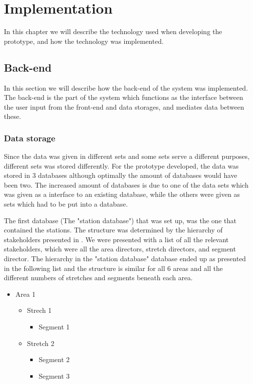 
\chapter{Implementation} %
\label{cha:implementation}
In this chapter we will describe the technology used when developing the 
prototype, and how the technology was implemented. 

\section{Back-end} %
\label{sec:back_end}
In this section we will describe how the back-end of the system was 
implemented. The back-end is the part of the system which functions as the
interface between the user input from the front-end and data storages, and
mediates data between these.

\subsection{Data storage} %
\label{sub:back_end_data_storage}
Since the data was given in different sets and some sets serve a different
purposes, different sets was stored differently. For the prototype developed, 
the data was stored in 3 databases although optimally the amount of databases 
would have been two. The increased amount of databases is due to one of the data sets which was given as a interface to an existing database, while the others were given as sets which had to be put into a database.

The first database (The "station database") that was set up, was the one that 
contained the stations.
The structure was determined by the hierarchy of stakeholders presented in
.  We were presented with a list of all the
relevant stakeholders, which were all the area directors, stretch directors,
and segment director. The hierarchy in the "station database" database ended 
up as presented in the following list and the structure is similar for all 6 
areas and all the different numbers of stretches and segments beneath each 
area.

\begin{itemize}
	\item Area 1
	\begin{itemize}
		\item Strech 1
		\begin{itemize}
			\item Segment 1
		\end{itemize}
		\item Stretch 2
		\begin{itemize}
			\item Segment 2
			\item Segment 3
		\end{itemize}
	\end{itemize}
\end{itemize}


